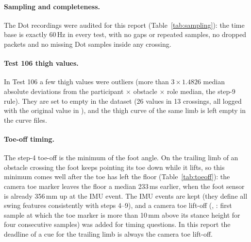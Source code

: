 \begin{table}[htbp]
\centering
\caption{Obstacle rows not used by the ML analyses (first reason that applies).}
\label{tab:exclusions}
\small

\end{table}

\paragraph{Sampling and completeness.} The Dot recordings were audited for this report (Table~\ref{tab:sampling}): the
time base is exactly 60\,Hz in every test, with no gaps or repeated samples, no dropped packets and no missing Dot samples
inside any crossing.

\begin{table}[htbp]
\centering
\caption{Dot sampling audit (build report, task 14).}
\label{tab:sampling}

\end{table}

\paragraph{Test 106 thigh values.} In Test 106 a few thigh values were outliers (more than $3 \times 1.4826$ median
absolute deviations from the participant $\times$ obstacle $\times$ role median, the step-9 rule). They are set to empty in the
dataset (26 values in 13 crossings, all logged with the original value in ), and the thigh curve of
the same limb is left empty in the curve files.

\paragraph{Toe-off timing.}
\label{sec:toeoff}
The step-4 toe-off is the minimum of the foot angle. On the trailing limb of an obstacle crossing the foot keeps pointing
its toe down while it lifts, so this minimum comes well after the toe has left the floor (Table~\ref{tab:toeoff}): the
camera toe marker leaves the floor a median 233\,ms earlier, when the foot sensor is already 356\,mm up at the IMU event.
The IMU events are kept (they define all swing features consistently with steps 4--9), and a camera toe lift-off
(, : first sample at which the toe marker is more than 10\,mm above its stance
height for four consecutive samples) was added for timing questions. In this report the deadline of a cue for the
trailing limb is always the camera toe lift-off.

